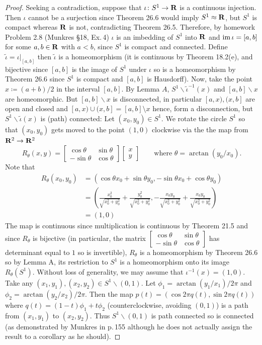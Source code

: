 \begin{proof}
Seeking a contradiction, suppose that $\iota\colon S^1\to\mathbf{R}$ is a
continuous injection. Then $\iota$ cannot be a surjection since Theorem
26.6 would imply $S^1\approx\mathbf{R}$, but $S^1$ is compact whereas $\mathbf{R}$ is
not, contradicting Theorem 26.5. Therefore, by homework Problem 2.8
(Munkres \S18, Ex.\,4) $\iota$ is an imbedding of $S^1$ into $\mathbf{R}$ and
$\operatorname{im}\iota=[a,b]$ for some $a,b\in\mathbf{R}$ with $a<b$, since $S^1$ is compact
and connected. Define $\tilde{\iota}=\left.\iota\right|_{[a,b]}$ then
$\tilde\iota$ is a homeomorphism (it is continuous by Theorem 18.2(e),
and bijective since $[a,b]$ is the image of $S^1$ under $\iota$ so is a
homeomorphism by Theorem 26.6 since $S^1$ is compact and $[a,b]$ is
Hausdorff). Now, take the point $x\coloneqq (a+b)/2$ in the interval
$[a,b]$. By Lemma $A$, $S^1\smallsetminus\tilde\iota^{-1}(x)$ and
$[a,b]\smallsetminus x$ are homeomorphic. But $[a,b]\smallsetminus x$ is
disconnected, in particular $[a,x),(x,b]$ are open and closed and
$[a,x)\cup(x,b]=[a,b]\setminus x$ hence, form a disconnection, but
$S^1\smallsetminus\tilde\iota(x)$ is (path) connected: Let
$(x_0,y_0)\in S^1$. We rotate the circle $S^1$ so that
$(x_0,y_0)$ gets moved to the point $(1,0)$ clockwise via the the map from
$\mathbf{R}^2\to\mathbf{R}^2$
\[
R_\theta(x,y)=
\begin{bmatrix}
\cos\theta&\sin\theta\\
-\sin\theta&\cos\theta
\end{bmatrix}
\begin{bmatrix}
x\\y
\end{bmatrix}
\qquad\text{where $\theta=\arctan(y_0/x_0)$}.
\]
Note that
\begin{align*}
R_\theta(x_0,y_0)
&=\left(\cos\theta x_0+\sin\theta y_0,-\sin\theta x_0+\cos\theta
  y_0\right)\\
&=\left(\frac{x_0^2}{\sqrt{x_0^2+y_0^2}}+\frac{y_0^2}{\sqrt{x_0^2+y_0^2}}
  ,-\frac{x_0y_0}{\sqrt{x_0^2+y_0^2}}+\frac{x_0y_0}{\sqrt{x_0^2+y_0^2}}\right)\\
&=(1,0)
\end{align*}
The map is continuous since multiplication is continuous by Theorem
21.5 and since $R_\theta$ is bijective (in particular, the matrix
$\left[\begin{smallmatrix}\cos\theta&\sin\theta\\-\sin\theta&\cos\theta\end{smallmatrix}\right]$
has determinant equal to $1$ so is invertible), $R_\theta$ is a
homeomorphism by Theorem 26.6 so by Lemma A, its restriction to $S^1$ is a
homeomorphism onto its image $R_\theta(S^1)$. Without loss of generality,
we may assume that $\iota^{-1}(x)=(1,0)$. Take any $(x_1,y_1),(x_2,y_2)\in
S^1\smallsetminus(0,1)$. Let $\phi_1=\arctan(y_1/x_1)/2\pi$ and
$\phi_2=\arctan(y_2/x_2)/2\pi$. Then the map $p(t)=(\cos 2\pi q(t),\sin
2\pi q(t))$ where $q(t)=(1-t)\phi_1+t\phi_2$ (counterclockwise, avoiding
$(0,1)$) is a path from $(x_1,y_1)$ to $(x_2,y_2)$. Thus $S^1\smallsetminus
(0,1)$ is path connected so is connected (as demonstrated by Munkres in
p.\,155 although he does not actually assign the result to a corollary as
he should).


\end{proof}
